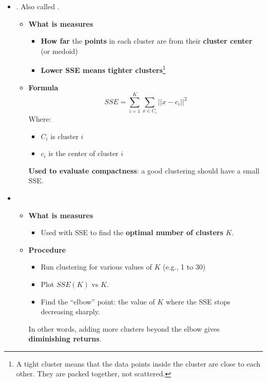 \begin{itemize}
    \item {}. Also called .
    \begin{itemize}
        \item[\textcolor{Green3}{\faIcon{question-circle}}] \textcolor{Green3}{\textbf{What is measures}}
        \begin{itemize}
            \item \textbf{How far} the \textbf{points} in each cluster are from their \textbf{cluster center} (or medoid)
            \item \textbf{Lower SSE means tighter clusters}\footnote{%
                A tight cluster means that the data points inside the cluster are close to each other. They are packed together, not scattered. 
            }
        \end{itemize}
        \item[\textcolor{Red2}{\faIcon{book}}] \textcolor{Red2}{\textbf{Formula}}
        \begin{equation}
            SSE = \displaystyle\sum_{i=1}^{K} \sum_{x \in C_{i}} \left|\left|x - c_{i}\right|\right|^{2}
        \end{equation}
        Where:
        \begin{itemize}
            \item $C_{i}$ is cluster $i$
            \item $c_{i}$ is the center of cluster $i$
        \end{itemize}
        \textbf{Used to evaluate compactness}: a good clustering should have a small SSE.
    \end{itemize}

    
    \newpage


    \item {}
    \begin{itemize}
        \item[\textcolor{Green3}{\faIcon{question-circle}}] \textcolor{Green3}{\textbf{What is measures}}
        \begin{itemize}
            \item Used with SSE to find the \textbf{optimal number of clusters} $K$.
        \end{itemize}
        \item[\textcolor{Green3}{\faIcon{tools}}] \textcolor{Green3}{\textbf{Procedure}}
        \begin{itemize}
            \item Run clustering for various values of $K$ (e.g., 1 to 30)
            \item Plot $SSE\left(K\right)$ vs $K$.
            \item Find the ``elbow'' point: the value of $K$ where the SSE stops decreasing sharply.
        \end{itemize}
        In other words, adding more clusters beyond the elbow gives \textbf{diminishing returns}.
    \end{itemize}



\end{itemize}
